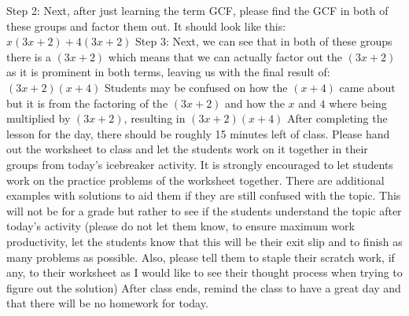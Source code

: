 \begin{outline}
        \2 Step 2: Next, after just learning the term GCF, please find the GCF in both of these groups and factor them out. It should look like this: $x(3x+2)+4(3x+2)$
        \2 Step 3: Next, we can see that in both of these groups there is a $(3x+2)$ which means that we can actually factor out the $(3x+2)$ as it is prominent in both terms, leaving us with the final result of: $(3x+2)(x+4)$
        \2 Students may be confused on how the $(x+4)$ came about but it is from the factoring of the $(3x+2)$ and how the $x$ and $4$ where being multiplied by $(3x+2)$, resulting in $(3x+2)(x+4)$
    \1 After completing the lesson for the day, there should be roughly 15 minutes left of class. Please hand out the worksheet to class and let the students work on it together in their groups from today's icebreaker activity. It is strongly encouraged to let students work on the practice problems of the worksheet together. There are additional examples with solutions to aid them if they are still confused with the topic. This will not be for a grade but rather to see if the students understand the topic after today's activity (please do not let them know, to ensure maximum work productivity, let the students know that this will be their exit slip and to finish as many problems as possible. Also, please tell them to staple their scratch work, if any, to their worksheet as I would like to see their thought process when trying to figure out the solution)
    \1 After class ends, remind the class to have a great day and that there will be no homework for today. 
\end{outline}